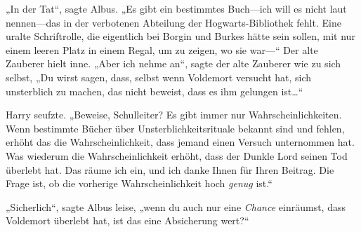 „In der Tat“, sagte Albus. „Es gibt ein bestimmtes Buch—ich will es nicht laut nennen—das in der verbotenen Abteilung der Hogwarts-Bibliothek fehlt. Eine uralte Schriftrolle, die eigentlich bei Borgin und Burkes hätte sein sollen, mit nur einem leeren Platz in einem Regal, um zu zeigen, wo sie war—“ Der alte Zauberer hielt inne. „Aber ich nehme an“, sagte der alte Zauberer wie zu sich selbst, „Du wirst sagen, dass, selbst wenn Voldemort versucht hat, sich unsterblich zu machen, das nicht beweist, dass es ihm gelungen ist…“

Harry seufzte. „Beweise, Schulleiter? Es gibt immer nur Wahrscheinlichkeiten. Wenn bestimmte Bücher über Unsterblichkeitsrituale bekannt sind und fehlen, erhöht das die Wahrscheinlichkeit, dass jemand einen Versuch unternommen hat. Was wiederum die Wahrscheinlichkeit erhöht, dass der Dunkle Lord seinen Tod überlebt hat. Das räume ich ein, und ich danke Ihnen für Ihren Beitrag. Die Frage ist, ob die vorherige Wahrscheinlichkeit hoch \emph{genug} ist.“

„Sicherlich“, sagte Albus leise, „wenn du auch nur eine \emph{Chance} einräumst, dass Voldemort überlebt hat, ist das eine Absicherung wert?“

